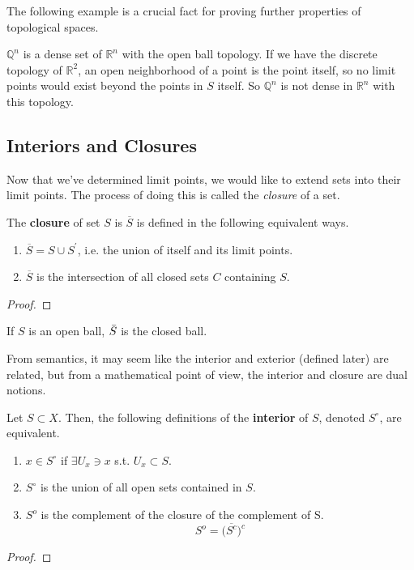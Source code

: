   The following example is a crucial fact for proving further properties of topological spaces. 

  \begin{example}
    $\mathbb{Q}^{n}$ is a dense set of $\mathbb{R}^{n}$ with the open ball topology. If we have the discrete topology of $\mathbb{R}^{2}$, an open neighborhood of a point is the point itself, so no limit points would exist beyond the points in $S$ itself. So $\mathbb{Q}^{n}$ is not dense in $\mathbb{R}^{n}$ with this topology. 
  \end{example}

\subsection{Interiors and Closures}

  Now that we've determined limit points, we would like to extend sets into their limit points. The process of doing this is called the \textit{closure} of a set. 

  \begin{definition}[Closure]
    The \textbf{closure} of set $S$ is $\overline{S}$ is defined in the following equivalent ways. 
    \begin{enumerate}
      \item $\overline{S} = S \cup S^\prime$, i.e. the union of itself and its limit points. 
      \item $\overline{S}$ is the intersection of all closed sets $C$ containing $S$. 
    \end{enumerate}
  \end{definition}
  \begin{proof}
    
  \end{proof}

  \begin{example}
    If $S$ is an open ball, $\Bar{S}$ is the closed ball. 
  \end{example}

  From semantics, it may seem like the interior and exterior (defined later) are related, but from a mathematical point of view, the interior and closure are dual notions. 

  \begin{definition}[Interior]
    Let $S \subset X$. Then, the following definitions of the \textbf{interior} of $S$, denoted $S^\circ$, are equivalent. 
    \begin{enumerate}
      \item $x \in S^\circ$ if $\exists U_x \ni x$ s.t. $U_x \subset S$. 
      \item $S^\circ$ is the union of all open sets contained in $S$. 
      \item $S^{o}$ is the complement of the closure of the complement of S. 
      \begin{equation}
        S^{o} = \big(\overline{S^{c}}\big)^{c}
      \end{equation}
    \end{enumerate}
  \end{definition}
  \begin{proof}
    
  \end{proof}

